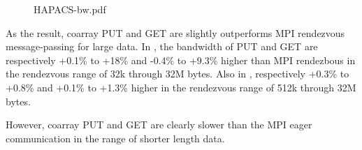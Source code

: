 \begin{figure}[tbh]
  \begin{center}
    \caption{HAPACS-bw.pdf}\label{fig:HAPACS-bw}
  \end{center}
\end{figure}

As the result, coarray PUT and GET are slightly outperforms MPI rendezvous 
message-passing for large data.
In , the bandwidth of PUT and GET are respectively 
+0.1\% to +18\% and -0.4\% to +9.3\% higher than MPI rendezbous in the 
rendezvous range of 32k through 32M bytes.
Also in , respectively +0.3\% to +0.8\% and 
+0.1\% to +1.3\% higher in the rendezvous range of 512k through 32M bytes.

However, coarray PUT and GET are clearly slower than the MPI eager 
communication in the range of shorter length data.


